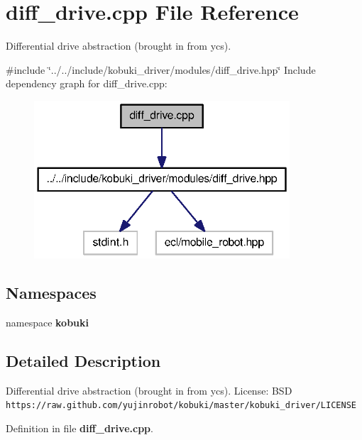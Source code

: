 \section{diff\-\_\-drive.\-cpp \-File \-Reference}
\label{diff__drive_8cpp}


\-Differential drive abstraction (brought in from ycs).  


{\ttfamily \#include \char`\"{}../../include/kobuki\-\_\-driver/modules/diff\-\_\-drive.\-hpp\char`\"{}}\*
\-Include dependency graph for diff\-\_\-drive.\-cpp\-:
\nopagebreak
\begin{figure}[H]
\begin{center}
\leavevmode
\includegraphics[width=270pt]{diff__drive_8cpp__incl}
\end{center}
\end{figure}
\subsection*{\-Namespaces}
\begin{DoxyCompactItemize}
\item 
namespace {\bf kobuki}
\end{DoxyCompactItemize}


\subsection{\-Detailed \-Description}
\-Differential drive abstraction (brought in from ycs). \-License\-: \-B\-S\-D {\tt https\-://raw.\-github.\-com/yujinrobot/kobuki/master/kobuki\-\_\-driver/\-L\-I\-C\-E\-N\-S\-E} 

\-Definition in file {\bf diff\-\_\-drive.\-cpp}.

